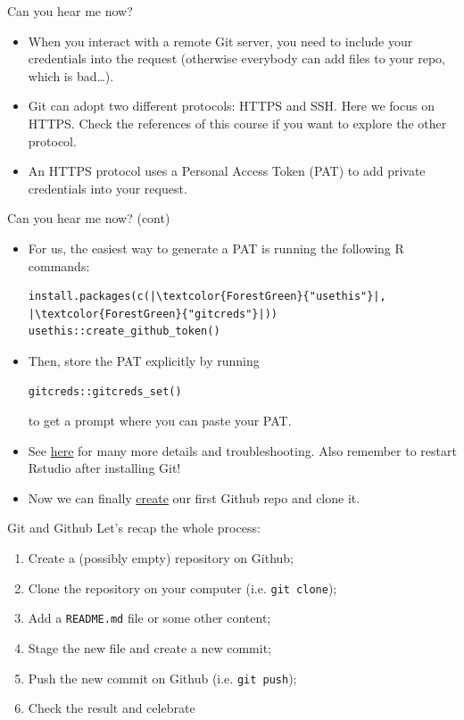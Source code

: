 \documentclass[
hyperref={bookmarks=false},
xcolor={dvipsnames,svgnames*,x11names*}, 
12pt
]{beamer}
\begin{document}
\begin{frame}{Can you hear me now?}
\vspace{-0.5cm}
\begin{itemize}
\itemsep 2ex
\item When you interact with a remote Git server, you need to include your credentials into the request (otherwise everybody can add files to your repo, which is bad\dots). 
\item Git can adopt two different protocols: HTTPS and SSH. Here we focus on HTTPS. Check the references of this course if you want to explore the other protocol. 
\item An HTTPS protocol uses a Personal Access Token (PAT) to add private credentials into your request. 
\end{itemize}
\end{frame}

\begin{frame}[fragile]{Can you hear me now? (cont)}
\vspace{-0.5cm}
\begin{itemize}
\itemsep 2ex
\item For us, the easiest way to generate a PAT is running the following R commands: 
\begin{lstlisting}[basicstyle=\color{black}\ttfamily\scriptsize, backgroundcolor=\color{white}]
install.packages(c(|\textcolor{ForestGreen}{"usethis"}|, |\textcolor{ForestGreen}{"gitcreds"}|))
usethis::create_github_token()
\end{lstlisting}
\item Then, store the PAT explicitly by running
\begin{lstlisting}[basicstyle=\color{black}\ttfamily\scriptsize, backgroundcolor=\color{white}]
gitcreds::gitcreds_set()
\end{lstlisting} 
to get a prompt where you can paste your PAT.  
\item See \href{https://happygitwithr.com/https-pat.html}{here} for many more details and troubleshooting. Also remember to restart Rstudio after installing Git!
\item Now we can finally \href{https://github.com/new}{create} our first Github repo and clone it.
\end{itemize}
\end{frame}

\begin{frame}{Git and Github}
\vspace{-0.5cm}
Let's recap the whole process: 
\begin{enumerate}
\itemsep 2ex
\item Create a (possibly empty) repository on Github; 
\item Clone the repository on your computer (i.e. \texttt{git clone});
\item Add a \texttt{README.md} file or some other content; 
\item Stage the new file and create a new commit; 
\item Push the new commit on Github (i.e. \texttt{git push}); 
\item Check the result and celebrate   
\end{enumerate}
\end{frame}
\end{document}
